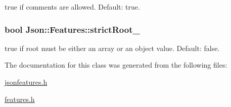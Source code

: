 {\ttfamily true} if comments are allowed. Default\-: {\ttfamily true}. 

\hypertarget{classJson_1_1Features_a1162c37a1458adc32582b585b552f9c3}{
\subsubsection[{strict\-Root\-\_\-}]{\setlength{\rightskip}{0pt plus 5cm}bool Json\-::\-Features\-::strict\-Root\-\_\-}}\label{d0/d7e/classJson_1_1Features_a1162c37a1458adc32582b585b552f9c3}


{\ttfamily true} if root must be either an array or an object value. Default\-: {\ttfamily false}. 



The documentation for this class was generated from the following files\-:\begin{DoxyCompactItemize}
\item 
\hyperlink{jsonfeatures_8h}{jsonfeatures.\-h}\item 
\hyperlink{features_8h}{features.\-h}\end{DoxyCompactItemize}

